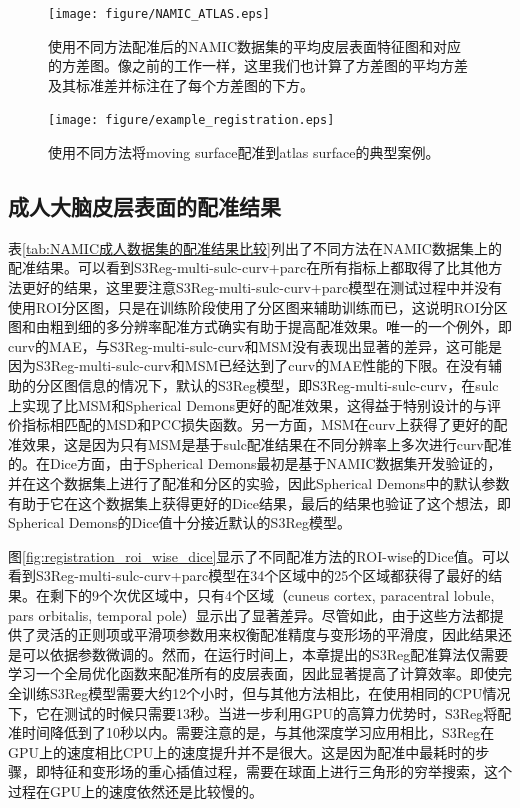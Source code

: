 \begin{figure}[h]
	\centering
	\texttt{[image: figure/NAMIC\_ATLAS.eps]}
	\caption{使用不同方法配准后的NAMIC数据集的平均皮层表面特征图和对应的方差图。像之前的工作\cite{lyu2019hierarchical}一样，这里我们也计算了方差图的平均方差及其标准差并标注在了每个方差图的下方。}
	\label{fig:NAMIC_ATLAS}
\end{figure}

\begin{figure}[h]
	\centering
	\texttt{[image: figure/example\_registration.eps]}
	\caption{使用不同方法将moving surface配准到atlas surface的典型案例。}
	\label{fig:example_registration}
\end{figure}

\subsection{成人大脑皮层表面的配准结果}
表\ref{tab:NAMIC成人数据集的配准结果比较}列出了不同方法在NAMIC数据集上的配准结果。可以看到S3Reg-multi-sulc-curv+parc在所有指标上都取得了比其他方法更好的结果，这里要注意S3Reg-multi-sulc-curv+parc模型在测试过程中并没有使用ROI分区图，只是在训练阶段使用了分区图来辅助训练而已，这说明ROI分区图和由粗到细的多分辨率配准方式确实有助于提高配准效果。唯一的一个例外，即curv的MAE，与S3Reg-multi-sulc-curv和MSM没有表现出显著的差异，这可能是因为S3Reg-multi-sulc-curv和MSM已经达到了curv的MAE性能的下限。在没有辅助的分区图信息的情况下，默认的S3Reg模型，即S3Reg-multi-sulc-curv，在sulc上实现了比MSM和Spherical Demons更好的配准效果，这得益于特别设计的与评价指标相匹配的MSD和PCC损失函数。另一方面，MSM在curv上获得了更好的配准效果，这是因为只有MSM是基于sulc配准结果在不同分辨率上多次进行curv配准的。在Dice方面，由于Spherical Demons最初是基于NAMIC数据集开发验证的，并在这个数据集上进行了配准和分区的实验，因此Spherical Demons中的默认参数有助于它在这个数据集上获得更好的Dice结果，最后的结果也验证了这个想法，即Spherical Demons的Dice值十分接近默认的S3Reg模型。

图\ref{fig:registration_roi_wise_dice}显示了不同配准方法的ROI-wise的Dice值。可以看到S3Reg-multi-sulc-curv+parc模型在34个区域中的25个区域都获得了最好的结果。在剩下的9个次优区域中，只有4个区域（cuneus cortex, paracentral lobule, pars orbitalis, temporal pole）显示出了显著差异。尽管如此，由于这些方法都提供了灵活的正则项或平滑项参数用来权衡配准精度与变形场的平滑度，因此结果还是可以依据参数微调的。然而，在运行时间上，本章提出的S3Reg配准算法仅需要学习一个全局优化函数来配准所有的皮层表面，因此显著提高了计算效率。即使完全训练S3Reg模型需要大约12个小时，但与其他方法相比，在使用相同的CPU情况下，它在测试的时候只需要13秒。当进一步利用GPU的高算力优势时，S3Reg将配准时间降低到了10秒以内。需要注意的是，与其他深度学习应用相比，S3Reg在GPU上的速度相比CPU上的速度提升并不是很大。这是因为配准中最耗时的步骤，即特征和变形场的重心插值过程，需要在球面上进行三角形的穷举搜索，这个过程在GPU上的速度依然还是比较慢的。

